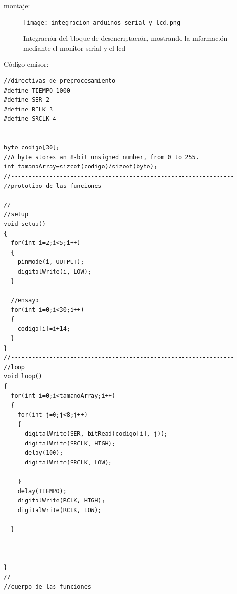 \documentclass{article}
\begin{document}
montaje:
\begin{figure}[h]
\texttt{[image: integracion arduinos serial y lcd.png]}
\centering
\caption{Integración del bloque de desencriptación, mostrando la información mediante el monitor serial y el lcd}
\label{fig:serialLcd}
\end{figure}

Código emisor:
\begin{lstlisting}[style=myArduino]
//directivas de preprocesamiento
#define TIEMPO 1000
#define SER 2
#define RCLK 3
#define SRCLK 4


byte codigo[30];
//A byte stores an 8-bit unsigned number, from 0 to 255.
int tamanoArray=sizeof(codigo)/sizeof(byte);
//----------------------------------------------------------------
//prototipo de las funciones

//----------------------------------------------------------------
//setup
void setup()
{
  for(int i=2;i<5;i++)
  {
    pinMode(i, OUTPUT);
    digitalWrite(i, LOW);
  }
  
  //ensayo
  for(int i=0;i<30;i++)
  {
    codigo[i]=i+14;
  }
}
//----------------------------------------------------------------
//loop
void loop()
{
  for(int i=0;i<tamanoArray;i++)
  {
    for(int j=0;j<8;j++)
    {
      digitalWrite(SER, bitRead(codigo[i], j));
      digitalWrite(SRCLK, HIGH);
      delay(100);
      digitalWrite(SRCLK, LOW);

    }
    delay(TIEMPO);
    digitalWrite(RCLK, HIGH);
    digitalWrite(RCLK, LOW);
    
  }
  
  
  
}
//----------------------------------------------------------------
//cuerpo de las funciones
\end{lstlisting}
\end{document}
